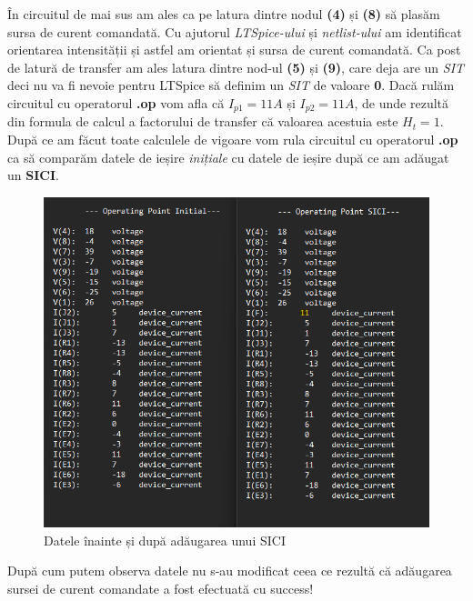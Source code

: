 \documentclass[12pt, a4paper]{article}
\begin{document}
\begin{center}
\begin{tikzpicture}[x=0.75pt,y=0.75pt,yscale=-1,xscale=1]
\end{tikzpicture}

\end{center}

\newpage

În circuitul de mai sus am ales ca pe latura dintre nodul \textbf{(4)} și \textbf{(8)} să plasăm sursa de curent comandată. Cu ajutorul \emph{LTSpice-ului} și \emph{netlist-ului} am identificat orientarea intensității și astfel am orientat și sursa de curent comandată. Ca post de latură de transfer am ales latura dintre nod-ul \textbf{(5)} și \textbf{(9)}, care deja are un \emph{SIT} deci nu va fi nevoie pentru LTSpice să definim un \emph{SIT} de valoare \textbf{0}. Dacă rulăm circuitul cu operatorul \textbf{.op} vom afla că $I_{p1} = 11A$ și $I_{p2} = 11A$, de unde rezultă din formula de calcul a factorului de transfer că valoarea acestuia este $H_t = 1$. După ce am făcut toate calculele de vigoare vom rula circuitul cu operatorul \textbf{.op} ca să comparăm datele de ieșire \emph{inițiale} cu datele de ieșire după ce am adăugat un \textbf{SICI}.


\begin{figure}[h]
    \centering
    \includegraphics[width=\linewidth, height=\textheight, keepaspectratio]{Compar_data.png}
    \caption{Datele înainte și după adăugarea unui SICI}
    \label{fig:SICI}
\end{figure}

După cum putem observa datele nu s-au modificat ceea ce rezultă că adăugarea sursei de curent comandate a fost efectuată cu success!
\newpage
\end{document}
